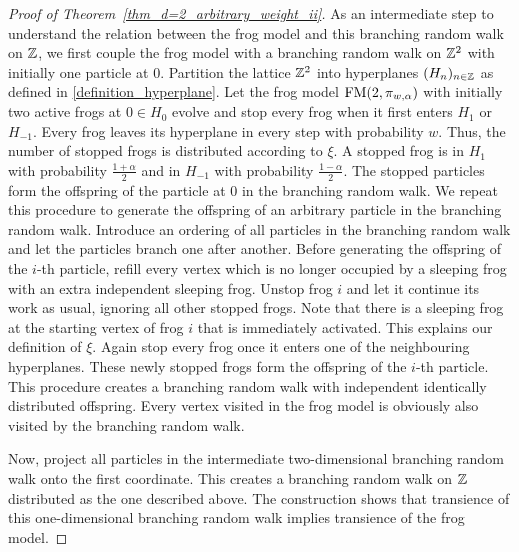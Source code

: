\begin{proof}[Proof of Theorem~\ref{thm_d=2_arbitrary_weight_ii}]
As an intermediate step to understand the relation between the frog model and this branching random walk on $\mathbb{Z}$, we first couple the frog model with a branching random walk on $\mathbb{Z}^2$ with initially one particle at $0$. Partition the lattice $\mathbb{Z}^2$ into hyperplanes $(H_n)_{n \in \mathbb{Z}}$ as defined in \eqref{definition_hyperplane}. Let the frog model $\operatorname{FM}(2,\pi_{w,\alpha})$ with initially two active frogs at $0 \in H_0$ evolve and stop every frog when it first enters $H_1$ or $H_{-1}$. Every frog leaves its hyperplane in every step with probability $w$. Thus, the number of stopped frogs is distributed according to $\xi$. A stopped frog is in $H_1$ with probability $\frac{1+\alpha}{2}$ and in $H_{-1}$ with probability $\frac{1-\alpha}{2}$. The stopped particles form the offspring of the particle at $0$ in the branching random walk. We repeat this procedure to generate the offspring of an arbitrary particle in the branching random walk. Introduce an ordering of all particles in the branching random walk and let the particles branch one after another. Before generating the offspring of the $i$-th particle, refill every vertex which is no longer occupied by a sleeping frog with an extra independent sleeping frog. Unstop frog $i$ and let it continue its work as usual, ignoring all other stopped frogs. Note that there is a sleeping frog at the starting vertex of frog $i$ that is immediately activated. This explains our definition of $\xi$. %
Again stop every frog once it enters one of the neighbouring hyperplanes. These newly stopped frogs form the offspring of the $i$-th particle. This procedure creates a branching random walk with independent identically distributed offspring. Every vertex visited in the frog model is obviously also visited by the branching random walk. 

Now, project all particles in the intermediate two-dimensional branching random walk onto the first coordinate. This creates a branching random walk on $\mathbb{Z}$ distributed as the one described above. The construction shows that transience of this one-dimensional branching random walk implies transience of the frog model.


\end{proof}

